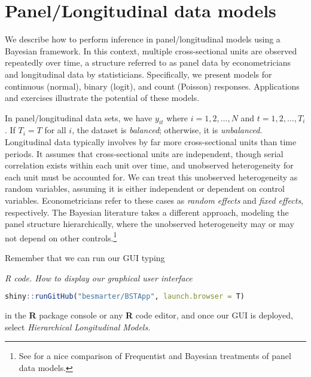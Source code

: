 \chapter{Panel/Longitudinal data models}\label{chap9}

We describe how to perform inference in panel/longitudinal models using a Bayesian framework. In this context, multiple cross-sectional units are observed repeatedly over time, a structure referred to as panel data by econometricians and longitudinal data by statisticians. Specifically, we present models for continuous (normal), binary (logit), and count (Poisson) responses. Applications and exercises illustrate the potential of these models.

In panel/longitudinal data sets, we have $y_{it}$ where $i=1,2,\dots,N$ and $t=1,2,\dots,T_i$. If $T_i=T$ for all $i$, the dataset is \textit{balanced}; otherwise, it is \textit{unbalanced}. Longitudinal data typically involves by far more cross-sectional units than time periods. It assumes that cross-sectional units are independent, though serial correlation exists within each unit over time, and unobserved heterogeneity for each unit must be accounted for. We can treat this unobserved heterogeneity as random variables, assuming it is either independent or dependent on control variables. Econometricians refer to these cases as \textit{random effects} and \textit{fixed effects}, respectively. The Bayesian literature takes a different approach, modeling the panel structure hierarchically, where the unobserved heterogeneity may or may not depend on other controls.\footnote{See \cite{rendon2013fixed} for a nice comparison of Frequentist and Bayesian treatments of panel data models.}

Remember that we can run our GUI typing

\begin{tcolorbox}[enhanced,width=4.67in,center upper,
	fontupper=\large\bfseries,drop shadow southwest,sharp corners]
	\textit{R code. How to display our graphical user interface}
	\begin{VF}
		\begin{lstlisting}[language=R]
		shiny::runGitHub("besmarter/BSTApp", launch.browser = T)\end{lstlisting}
	\end{VF}
\end{tcolorbox} 

in the \textbf{R} package console or any \textbf{R} code editor, and once our GUI is deployed, select \textit{Hierarchical Longitudinal Models}.



